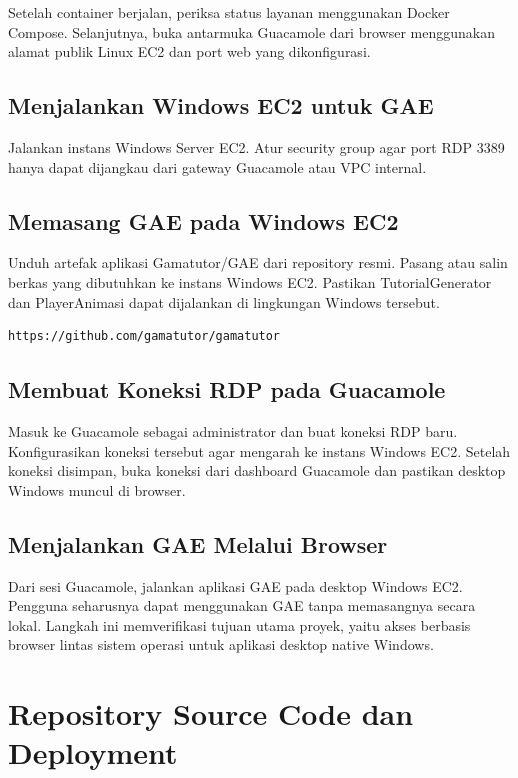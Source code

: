 \documentclass[conference]{IEEEtran}
\begin{document}
Setelah container berjalan, periksa status layanan menggunakan Docker Compose. Selanjutnya, buka antarmuka Guacamole dari browser menggunakan alamat publik Linux EC2 dan port web yang dikonfigurasi.

\subsection{Menjalankan Windows EC2 untuk GAE}

Jalankan instans Windows Server EC2. Atur security group agar port RDP 3389 hanya dapat dijangkau dari gateway Guacamole atau VPC internal.

\subsection{Memasang GAE pada Windows EC2}

Unduh artefak aplikasi Gamatutor/GAE dari repository resmi. Pasang atau salin berkas yang dibutuhkan ke instans Windows EC2. Pastikan TutorialGenerator dan PlayerAnimasi dapat dijalankan di lingkungan Windows tersebut.

\begin{lstlisting}[style=code]
https://github.com/gamatutor/gamatutor
\end{lstlisting}

\subsection{Membuat Koneksi RDP pada Guacamole}

Masuk ke Guacamole sebagai administrator dan buat koneksi RDP baru. Konfigurasikan koneksi tersebut agar mengarah ke instans Windows EC2. Setelah koneksi disimpan, buka koneksi dari dashboard Guacamole dan pastikan desktop Windows muncul di browser.

\subsection{Menjalankan GAE Melalui Browser}

Dari sesi Guacamole, jalankan aplikasi GAE pada desktop Windows EC2. Pengguna seharusnya dapat menggunakan GAE tanpa memasangnya secara lokal. Langkah ini memverifikasi tujuan utama proyek, yaitu akses berbasis browser lintas sistem operasi untuk aplikasi desktop native Windows.

\section{Repository Source Code dan Deployment}
\end{document}
